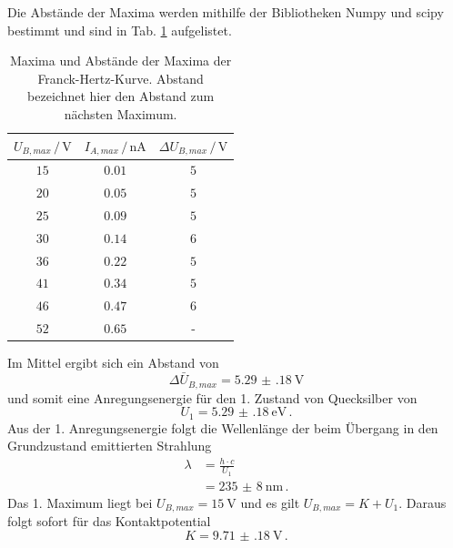 \FloatBarrier
Die Abstände der Maxima werden mithilfe der Bibliotheken Numpy\cite{numpy} und scipy\cite{scipy} bestimmt und sind in Tab. \ref{tab:abstand} aufgelistet.
\begin{table}
    \centering
    \begin{tabular}{ccc}
        \toprule
        $U_{B,max} \,/\, \si{\volt}$ & $I_{A,max} \,/\, \si{\nano\ampere}$ & $\Delta U_{B,max} \,/\, \si{\volt} $ \\
        \midrule
        $15$ & $0.01$ & $5$ \\
        $20$ & $0.05$ & $5$ \\
        $25$ & $0.09$ & $5$ \\
        $30$ & $0.14$ & $6$ \\
        $36$ & $0.22$ & $5$ \\
        $41$ & $0.34$ & $5$ \\
        $46$ & $0.47$ & $6$ \\
        $52$ & $0.65$ & - \\
        \bottomrule
    \end{tabular}
    \caption{Maxima und Abstände der Maxima der Franck-Hertz-Kurve. Abstand bezeichnet hier den Abstand zum nächsten Maximum.}
    \label{tab:abstand}
\end{table}
Im Mittel ergibt sich ein Abstand von
\begin{equation*}
    \Delta \bar{U}_{B,max} = \SI{5.29(18)}{\volt}
\end{equation*}
und somit eine Anregungsenergie für den 1. Zustand von Quecksilber von
\begin{equation}
    U_1 = \SI{5.29(18)}{\electronvolt} \, .
\end{equation}
Aus der 1. Anregungsenergie folgt die Wellenlänge der beim Übergang in den Grundzustand emittierten Strahlung
\begin{align*}
    \lambda &= \frac{h \cdot c}{U_1} \\
    &= \SI{235(8)}{\nano\metre} \, .
\end{align*}
Das 1. Maximum liegt bei $U_{B,max}=\SI{15}{\volt}$ und es gilt $U_{B,max} = K + U_1$.
Daraus folgt sofort für das Kontaktpotential
\begin{equation}
    K = \SI{9.71(18)}{\volt} \, .
\end{equation}